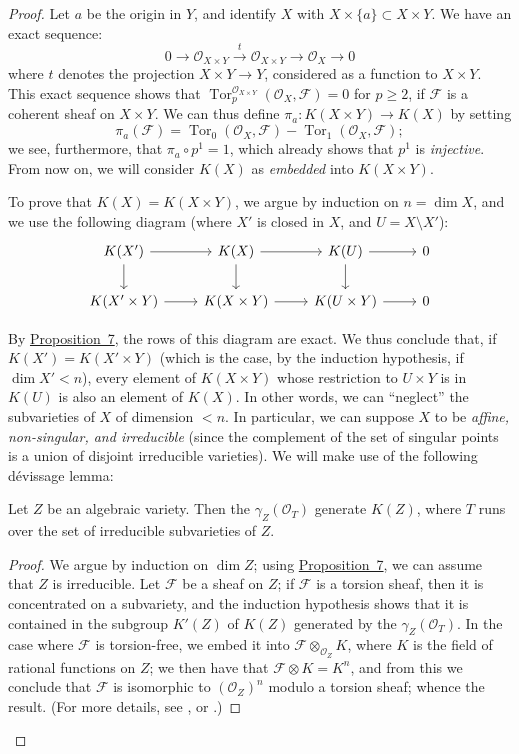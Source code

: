 \documentclass{article}
\theoremstyle{plain}
\newenvironment{lemma}[1]
    {\renewcommand\theinnerlemma{#1}\innerlemma}
    {\endinnerlemma}
\theoremstyle{definition}
\newcommand{\scr}[1]{{\mathscr{#1}}}
\renewcommand{\geq}{\geqslant}
\DeclareMathOperator{\Tor}{Tor}
\newcommand{\oldpage}[1]{\marginpar{\footnotesize$\Big\vert$ \textit{p.~#1}}}
\begin{document}
\begin{proof}
  Let $a$ be the origin in $Y$, and identify $X$ with $X\times\{a\}\subset X\times Y$.
  We have an exact sequence:
  \[
    0 \to \scr{O}_{X\times Y} \xrightarrow{t} \scr{O}_{X\times Y} \to \scr{O}_X \to 0
  \]
  where $t$ denotes the projection $X\times Y\to Y$, considered as a function to $X\times Y$.
  This exact sequence shows that $\Tor_p^{\scr{O}_{X\times Y}}(\scr{O}_X,\scr{F})=0$ for $p\geq2$, if $\scr{F}$ is a coherent sheaf on $X\times Y$.
  We can thus define $\pi_a\colon K(X\times Y)\to K(X)$ by setting
  \[
    \pi_a(\scr{F}) = \Tor_0(\scr{O}_X,\scr{F}) - \Tor_1(\scr{O}_X,\scr{F});
  \]
  we see, furthermore, that $\pi_a\circ p^1=1$, which already shows that $p^1$ is \emph{injective}.
  From now on, we will consider $K(X)$ as \emph{embedded} into $K(X\times Y)$.

  To prove that $K(X)=K(X\times Y)$, we argue by induction on $n=\dim X$, and we use the following diagram (where $X'$ is closed in $X$, and $U=X\setminus X'$):
  \[
    \begin{tikzcd}
      K(X') \rar \dar
      & K(X) \rar \dar
      & K(U) \rar \dar
      & 0
    \\K(X'\times Y) \rar
      & K(X\times Y) \rar
      & K(U\times Y) \rar
      & 0
    \end{tikzcd}
  \]

\oldpage{117}
  By \hyperref[proposition7]{Proposition~7}, the rows of this diagram are exact.
  We thus conclude that, if $K(X')=K(X'\times Y)$ (which is the case, by the induction hypothesis, if $\dim X'<n$), every element of $K(X\times Y)$ whose restriction to $U\times Y$ is in $K(U)$ is also an element of $K(X)$.
  In other words, we can ``neglect'' the subvarieties of $X$ of dimension $<n$.
  In particular, we can suppose $X$ to be \emph{affine, non-singular, and irreducible} (since the complement of the set of singular points is a union of disjoint irreducible varieties).
  We will make use of the following d\'{e}vissage lemma:

  \begin{lemma}{17}
  \label{lemma17}
    Let $Z$ be an algebraic variety.
    Then the $\gamma_Z(\scr{O}_T)$ generate $K(Z)$, where $T$ runs over the set of irreducible subvarieties of $Z$.
  \end{lemma}

  \begin{proof}
    We argue by induction on $\dim Z$;
    using \hyperref[proposition7]{Proposition~7}, we can assume that $Z$ is irreducible.
    Let $\scr{F}$ be a sheaf on $Z$;
    if $\scr{F}$ is a torsion sheaf, then it is concentrated on a subvariety, and the induction hypothesis shows that it is contained in the subgroup $K'(Z)$ of $K(Z)$ generated by the $\gamma_Z(\scr{O}_T)$.
    In the case where $\scr{F}$ is torsion-free, we embed it into $\scr{F}\otimes_{\scr{O}_Z}K$, where $K$ is the field of rational functions on $Z$;
    we then have that $\scr{F}\otimes K=K^n$, and from this we conclude that $\scr{F}$ is isomorphic to $(\scr{O}_Z)^n$ modulo a torsion sheaf;
    whence the result.
    (For more details, see \cite{14}, or \cite{6}.)
  \end{proof}


\end{proof}
\end{document}
